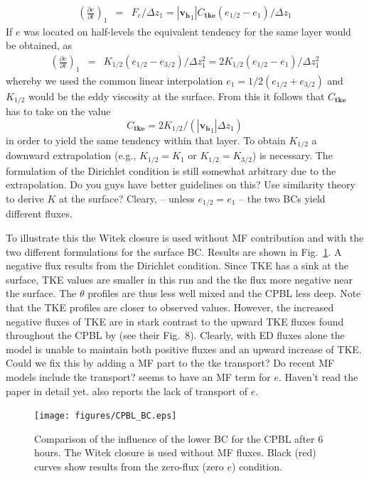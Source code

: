 \documentclass[dvipdfmx,a4paper,10pt]{article}
\begin{document}
\begin{eqnarray}
 \left(\frac{\partial e}{\partial t}\right)_1 &=& F_e/\Delta z_1=|\mathbf{v_h}_1| C_{\mathbf{tke}} (e_{1/2}-e_1)/\Delta z_1
\end{eqnarray}
If $e$ was located on half-levels the equivalent tendency for the same layer would be obtained, as
\begin{eqnarray}
 \left(\frac{\partial e}{\partial t}\right)_1 &=& K_{1/2} (e_{1/2}-e_{3/2})/\Delta z_1^2= 2 K_{1/2} (e_{1/2}-e_{1})/\Delta z_1^2 
\end{eqnarray}
whereby we used the common linear interpolation $e_{1}=1/2(e_{1/2}+e_{3/2})$ and $K_{1/2}$ would be the eddy viscosity at the surface. From this it follows that $C_{\mathbf{tke}}$ has to take on the value 
\begin{equation}
 C_{\mathbf{tke}}= 2 K_{1/2}/ (|\mathbf{v_h}_1|  \Delta z_1)
\end{equation}
in order to yield the same tendency within that layer. To obtain $K_{1/2}$ a downward extrapolation (e.g., $K_{1/2}=K_{1}$ or $K_{1/2}=K_{3/2}$) is necessary. {\color{blue} The formulation of the Dirichlet condition is still somewhat arbitrary due to the extrapolation. Do you guys have better guidelines on this? Use similarity theory to derive $K$ at the surface? }Cleary, -- unless $e_{1/2}=e_{1}$ -- the two BCs yield different fluxes. 

To illustrate this the Witek closure is used without MF contribution and with the two different formulations for the surface BC. Results are shown in Fig.~\ref{fig:BC}.  A negative flux results from the Dirichlet condition. Since TKE has a sink at the surface, TKE values are smaller in this run and the tke flux more negative near the surface. The $\theta$ profiles are thus less well mixed and the CPBL less deep. Note that the TKE profiles are closer to observed values. However, the increased negative fluxes of TKE are in stark contrast to the upward TKE fluxes found throughout the CPBL by \cite{lenschow74} (see their Fig.~8). Clearly, with ED fluxes alone the model is unable to maintain both positive fluxes and an upward increase of TKE. {\color{blue} Could we fix this by adding a MF part to the tke transport? Do recent MF models include tke transport? \cite{angevine10} seems to have an MF term for $e$. Haven't read the paper in detail yet. \cite{witek11} also reports the lack of transport of $e$.}

\begin{figure}[bthp]
\centering
 \texttt{[image: figures/CPBL\_BC.eps]}
\caption{Comparison of the influence of the lower BC for the CPBL after 6 hours. The Witek closure is used without MF fluxes. Black (red) curves show results from the zero-flux (zero $e$) condition. } \label{fig:BC}
\end{figure}
\end{document}
